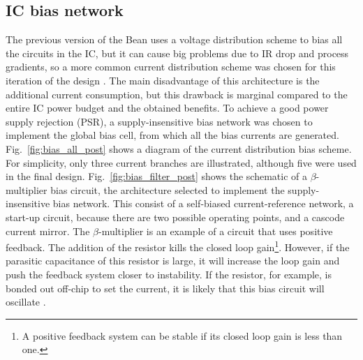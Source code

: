 \subsection{IC bias network}
The previous version of the Bean uses a voltage distribution scheme to bias all the circuits in the IC, but it can cause big problems due to IR drop and process gradients, so a more common current distribution scheme was chosen for this iteration of the design \citep{murmann101}.  The main disadvantage of this architecture is the additional current consumption, but this drawback is marginal compared to the entire IC power budget and the obtained benefits. To achieve a good power supply rejection (PSR), a supply-insensitive bias network was chosen to implement the global bias cell, from which all the bias currents are generated. Fig.~\ref{fig:bias_all_post} shows a diagram of the current distribution bias scheme. For simplicity, only three current branches are illustrated, although five were used in the final design. Fig.~\ref{fig:bias_filter_post} shows the schematic of a $\beta$-multiplier bias circuit, the architecture selected to implement the supply-insensitive bias network. This consist of a \mbox{self-biased} \mbox{current-reference} network, a \mbox{start-up} circuit, because there are two possible operating points, and a cascode current mirror. The $\beta$-multiplier is an example of a circuit that uses positive feedback. The addition of the resistor kills the closed loop gain\footnote{A positive feedback system can be stable if its closed loop gain is less than one.}. However, if the parasitic capacitance of this resistor is large, it will increase the loop gain and push the feedback system closer to instability. If the resistor, for example, is bonded out off-chip to set the current, it is likely that this bias circuit will oscillate \citep{baker101}.

